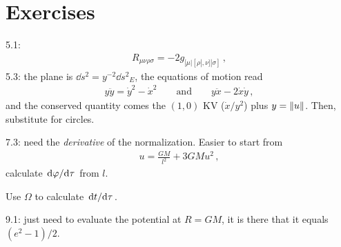 \documentclass[main.tex]{subfiles}
\begin{document}
\section{Exercises}

5.1: 
%
\begin{align}
R_{\mu \nu \rho \sigma } = - 2 g_{[\mu | [\rho|,\nu ] |\sigma ]}
\,,
\end{align}
%
5.3: the plane is \(\dd{s^2} = y^{-2} \dd{s^2}_{E}\), the equations of motion read 
%
\begin{align}
y \ddot{y} = \dot{y}^2 - \dot{x}^2
\qquad \text{and} \qquad
y \ddot{x} - 2 \dot{x} \dot{y}
\,,
\end{align}
%
and the conserved quantity comes the \((1,0)\) KV (\(\dot{x} / y^2\)) plus \(y = \norm{u}\). Then, substitute for circles.

7.3: need the \emph{derivative} of the normalization. Easier to start from 
%
\begin{align}
u = \frac{GM}{l^2} + 3GM u^2
\,,
\end{align}
calculate \(\dv*{\varphi }{\tau }\) from \(l\). 

Use \(\Omega \) to calculate \(\dv*{t}{\tau }\). 

9.1: just need to evaluate the potential at \(R = GM\), it is there that it equals \((e^2 - 1)/2\).
\end{document}
